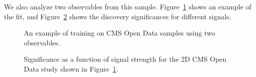 \documentclass[paper/ddppaper2.tex]{subfiles}
\begin{document}
We also analyze two observables from this sample. Figure~\ref{fig:cms_open_data_train_2d} shows an example of the fit, and Figure~\ref{fig:cms_open_data_2d_significances} shows the discovery significances for different signals.

\begin{figure}
    \caption{An example of training on CMS Open Data samples using two observables.}
    \label{fig:cms_open_data_train_2d}
\end{figure}


\begin{figure}
    \caption{Significance as a function of signal strength for the 2D CMS Open Data study shown in Figure~\ref{fig:cms_open_data_train_2d}.}
    \label{fig:cms_open_data_2d_significances}
\end{figure}
\end{document}
